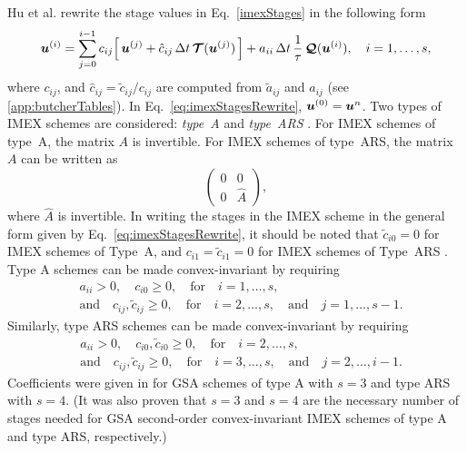 Hu et al. \cite{hu_etal_2018} rewrite the stage values in Eq.~\eqref{imexStages} in the following form
\begin{equation}
  \boldsymbol{u}^{(i)}
  =\sum_{j=0}^{i-1}c_{ij}\Big[\,\boldsymbol{u}^{(j)}+\hat{c}_{ij}\,\Delta t\,\boldsymbol{\mathcal{T}}(\boldsymbol{u}^{(j)})\,\Big]
  +a_{ii}\,\Delta t\,\frac{1}{\tau}\,\boldsymbol{\mathcal{Q}}(\boldsymbol{u}^{(i)}),\quad i=1,\ldots,s,
  \label{eq:imexStagesRewrite}
\end{equation}
where $c_{ij}$, and $\hat{c}_{ij}=\tilde{c}_{ij}/c_{ij}$ are computed from $\tilde{a}_{ij}$ and $a_{ij}$ (see \ref{app:butcherTables}).  
In Eq.~\eqref{eq:imexStagesRewrite}, $\boldsymbol{u}^{(0)}=\boldsymbol{u}^{n}$.  
Two types of IMEX schemes are considered: \emph{type~A} \cite{pareschiRusso_2005,dimarcoPareschi2013} and \emph{type~ARS} \cite{ascher_etal_1997}.  
For IMEX schemes of type~A, the matrix $A$ is invertible.  
For IMEX schemes of type~ARS, the matrix $A$ can be written as
\begin{equation*}
  \left( 
    \begin{matrix} 
       0 & 0 \\ 
       0 & \hat{A}
    \end{matrix}
  \right),
\end{equation*}
where $\hat{A}$ is invertible.  
In writing the stages in the IMEX scheme in the general form given by Eq.~\eqref{eq:imexStagesRewrite}, it should be noted that $\tilde{c}_{i0}=0$ for IMEX schemes of Type~A, and $c_{i1}=\tilde{c}_{i1}=0$ for IMEX schemes of Type~ARS \cite{hu_etal_2018}.  
Type A schemes can be made convex-invariant by requiring 
\begin{align}
  &a_{ii}>0, \quad c_{i0}\ge0, \quad \text{for} \quad i=1,\ldots,s, \nonumber \\
  &\text{and} \quad c_{ij},\tilde{c}_{ij}\ge0, \quad \text{for} \quad i=2,\ldots,s, \quad\text{and}\quad j=1,\ldots,s-1.  
  \label{eq:positivityConditionsTypeA}
\end{align}
Similarly, type ARS schemes can be made convex-invariant by requiring 
\begin{align}
  &a_{ii}>0, \quad c_{i0},\tilde{c}_{i0}\ge0, \quad \text{for} \quad i=2,\ldots,s, \nonumber \\
  &\text{and} \quad c_{ij},\tilde{c}_{ij}\ge0, \quad \text{for} \quad i=3,\ldots,s, \quad\text{and}\quad j=2,\ldots,i-1.  
  \label{eq:positivityConditionsTypeARS}
\end{align}
Coefficients were given in \cite{hu_etal_2018} for GSA schemes of type A with $s=3$ and type ARS with $s=4$.  
(It was also proven that $s=3$ and $s=4$ are the necessary number of stages needed for GSA second-order convex-invariant IMEX schemes of type A and type ARS, respectively.)  

